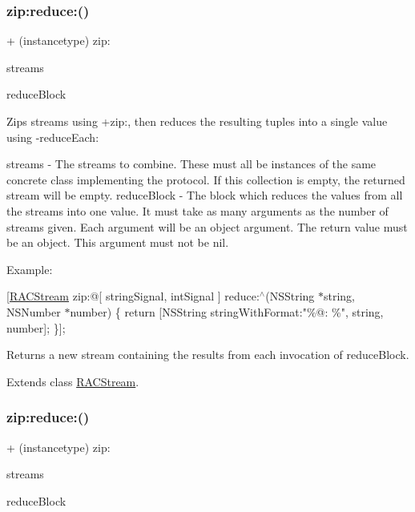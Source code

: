 \subsubsection{\texorpdfstring{zip\+:reduce\+:()}{zip:reduce:()}\hspace{0.1cm}{\footnotesize\ttfamily [1/3]}}
{\footnotesize\ttfamily + (instancetype) zip\+: \begin{DoxyParamCaption}\item[{(id$<$ N\+S\+Fast\+Enumeration $>$)}]{streams }\item[{reduce:(id($^\wedge$)())}]{reduce\+Block }\end{DoxyParamCaption}}

Zips streams using +zip\+:, then reduces the resulting tuples into a single value using -\/reduce\+Each\+:

streams -\/ The streams to combine. These must all be instances of the same concrete class implementing the protocol. If this collection is empty, the returned stream will be empty. reduce\+Block -\/ The block which reduces the values from all the streams into one value. It must take as many arguments as the number of streams given. Each argument will be an object argument. The return value must be an object. This argument must not be nil.

Example\+:

\mbox{[}\mbox{\hyperlink{interface_r_a_c_stream}{R\+A\+C\+Stream}} zip\+:@\mbox{[} string\+Signal, int\+Signal \mbox{]} reduce\+:$^\wedge$(N\+S\+String $\ast$string, N\+S\+Number $\ast$number) \{ return \mbox{[}N\+S\+String string\+With\+Format\+:"\%@\+: \%", string, number\mbox{]}; \}\mbox{]};

Returns a new stream containing the results from each invocation of {\ttfamily reduce\+Block}. 

Extends class \mbox{\hyperlink{interface_r_a_c_stream_aba7b1d8c9ac130afad52b0baca8ae016}{R\+A\+C\+Stream}}.

\mbox{\label{category_r_a_c_stream_07_operations_08_aba7b1d8c9ac130afad52b0baca8ae016}} 
\subsubsection{\texorpdfstring{zip\+:reduce\+:()}{zip:reduce:()}\hspace{0.1cm}{\footnotesize\ttfamily [2/3]}}
{\footnotesize\ttfamily + (instancetype) zip\+: \begin{DoxyParamCaption}\item[{(id$<$N\+S\+Fast\+Enumeration$>$)}]{streams }\item[{reduce:(id($^\wedge$)())}]{reduce\+Block }\end{DoxyParamCaption}}

